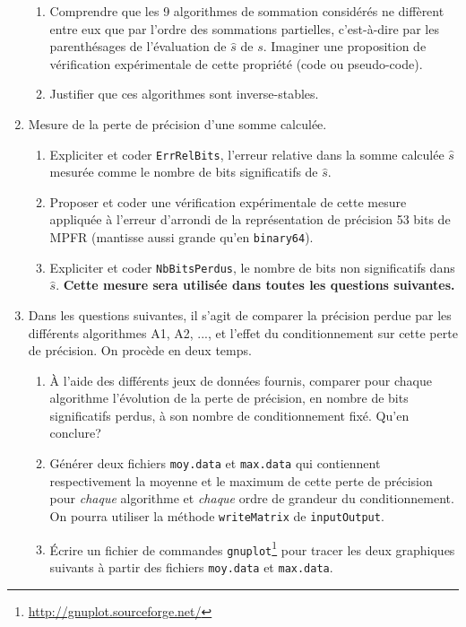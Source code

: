 \documentclass{exam}
\begin{document}
\begin{enumerate}
\begin{enumerate}
            \item Comprendre que les 9 algorithmes de sommation considérés ne diffèrent entre eux que par l'ordre des sommations partielles, c'est-à-dire par les parenthésages de l'évaluation de $\hat{s}$ de $s$. Imaginer une proposition de vérification expérimentale de cette propriété (code ou pseudo-code).
            \item Justifier que ces algorithmes sont inverse-stables.
        \end{enumerate}
        \item Mesure de la perte de précision d'une somme calculée.
        \begin{enumerate}
            \item Expliciter et coder \verb=ErrRelBits=, l'erreur relative dans la somme calculée $\hat{s}$ mesurée comme le nombre de bits significatifs de $\hat{s}$.
            \item Proposer et coder une vérification expérimentale de cette mesure appliquée à l'erreur d'arrondi de la représentation de précision 53 bits de MPFR (mantisse aussi grande qu'en \verb=binary64=).
            \item Expliciter et coder \verb=NbBitsPerdus=, le nombre de bits non significatifs dans $\hat{s}$. \textbf{Cette mesure sera utilisée dans toutes les questions suivantes.}
        \end{enumerate}
        \item Dans les questions suivantes, il s’agit de comparer la précision perdue par les différents algorithmes A1, A2, ..., et l’effet du conditionnement sur cette perte de précision. On procède en deux temps.
        \begin{enumerate}
            \item À l’aide des différents jeux de données fournis, comparer pour chaque algorithme l’évolution de la perte de précision, en nombre de bits significatifs perdus, à son nombre de conditionnement fixé. Qu’en conclure?
            \item Générer deux fichiers \verb=moy.data= et \verb=max.data= qui contiennent respectivement la moyenne et le maximum de cette perte de précision pour \textit{chaque} algorithme et \textit{chaque} ordre de grandeur du conditionnement. On pourra utiliser la méthode \verb=writeMatrix= de \verb=inputOutput=.
            \item Écrire un fichier de commandes \verb=gnuplot=\footnote{\url{http://gnuplot.sourceforge.net/}} pour tracer les deux graphiques suivants à partir des fichiers \verb=moy.data= et \verb=max.data=.

\end{enumerate}
\end{enumerate}
\end{document}

